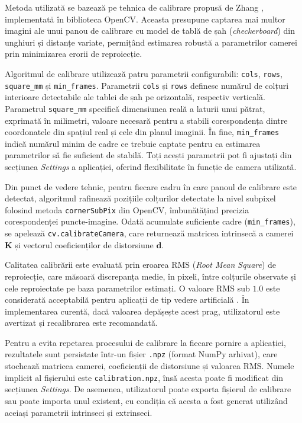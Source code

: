 \par Metoda utilizată se bazează pe tehnica de calibrare propusă de Zhang \cite{zhang2000}, implementată în biblioteca OpenCV. Aceasta presupune captarea mai multor imagini ale unui panou de calibrare cu model de tablă de șah (\textit{checkerboard}) din unghiuri și distanțe variate, permițând estimarea robustă a parametrilor camerei prin minimizarea erorii de reproiecție.

\par Algoritmul de calibrare utilizează patru parametrii configurabili: \texttt{cols}, \texttt{rows}, \texttt{square\_mm} și \texttt{min\_frames}. Parametrii \texttt{cols} și \texttt{rows} definesc numărul de colțuri interioare detectabile ale tablei de șah pe orizontală, respectiv verticală. Parametrul \texttt{square\_mm} specifică dimensiunea reală a laturii unui pătrat, exprimată în milimetri, valoare necesară pentru a stabili corespondența dintre coordonatele din spațiul real și cele din planul imaginii. În fine, \texttt{min\_frames} indică numărul minim de cadre ce trebuie captate pentru ca estimarea parametrilor să fie suficient de stabilă. Toți acești parametrii pot fi ajustați din secțiunea \textit{Settings} a aplicației, oferind flexibilitate în funcție de camera utilizată.

\par Din punct de vedere tehnic, pentru fiecare cadru în care panoul de calibrare este detectat, algoritmul rafinează pozițiile colțurilor detectate la nivel subpixel folosind metoda \texttt{cornerSubPix} din OpenCV, îmbunătățind precizia corespondenței puncte-imagine. Odată acumulate suficiente cadre (\texttt{min\_frames}), se apelează \texttt{cv.calibrateCamera}, care returnează matricea intrinsecă a camerei $\mathbf{K}$ și vectorul coeficienților de distorsiune $\boldsymbol{d}$.

\par Calitatea calibrării este evaluată prin eroarea RMS (\textit{Root Mean Square}) de reproiecție, care măsoară discrepanța medie, în pixeli, între colțurile observate și cele reproiectate pe baza parametrilor estimați. O valoare RMS sub $1.0$ este considerată acceptabilă pentru aplicații de tip vedere artificială \cite{zhang2000}. În implementarea curentă, dacă valoarea depășește acest prag, utilizatorul este avertizat și recalibrarea este recomandată.

\par Pentru a evita repetarea procesului de calibrare la fiecare pornire a aplicației, rezultatele sunt persistate într-un fișier \texttt{.npz} (format NumPy arhivat), care stochează matricea camerei, coeficienții de distorsiune și valoarea RMS. Numele implicit al fișierului este \texttt{calibration.npz}, însă acesta poate fi modificat din secțiunea \textit{Settings}. De asemenea, utilizatorul poate exporta fișierul de calibrare sau poate importa unul existent, cu condiția că acesta a fost generat utilizând aceiași parametrii intrinseci și extrinseci.

